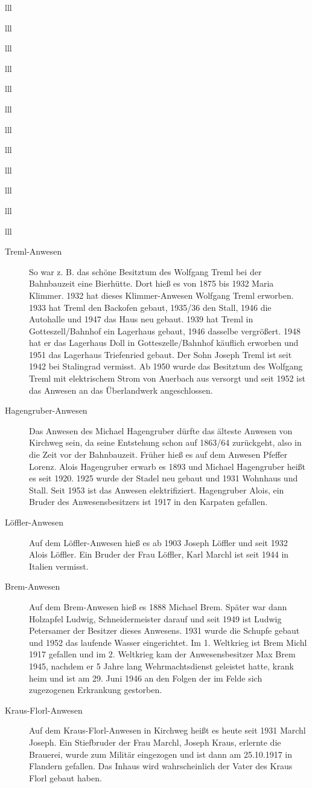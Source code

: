 \documentclass[12pt,a4pager]{book}
\begin{document}
\begin{tabuluar}{lll}
\begin{tabuluar}{lll}
\begin{tabuluar}{lll}
\begin{tabuluar}{lll}
\begin{tabuluar}{lll}
\begin{tabuluar}{lll}
\begin{tabuluar}{lll}
\begin{tabuluar}{lll}
\begin{tabuluar}{lll}
\begin{tabuluar}{lll}
\begin{tabuluar}{lll}
\begin{tabuluar}{lll}
\begin{description}
\item[Treml-Anwesen] So war z. B. das schöne Besitztum des Wolfgang Treml bei
der Bahnbauzeit eine Bierhütte. Dort hieß es von 1875 bis 1932 Maria Klimmer.
1932 hat dieses Klimmer-Anwesen Wolfgang Treml erworben. 1933 hat Treml den
Backofen gebaut, 1935/36 den Stall, 1946 die Autohalle und 1947 das Haus neu
gebaut. 1939 hat Treml in Gotteszell/Bahnhof ein Lagerhaus gebaut, 1946 dasselbe
vergrößert. 1948 hat er das Lagerhaus Doll in Gotteszelle/Bahnhof käuflich
erworben und 1951 das Lagerhaus Triefenried gebaut. Der Sohn Joseph Treml ist
seit 1942 bei Stalingrad vermisst. Ab 1950 wurde das Besitztum des Wolfgang
Treml mit elektrischem Strom von Auerbach aus versorgt und seit 1952 ist das
Anwesen an das Überlandwerk angeschlossen.

\item[Hagengruber-Anwesen] Das Anwesen des Michael Hagengruber dürfte das
älteste Anwesen von Kirchweg sein, da seine Entstehung schon auf 1863/64
zurückgeht, also in die Zeit vor der Bahnbauzeit. Früher hieß es auf dem Anwesen
Pfeffer Lorenz. Alois Hagengruber erwarb es 1893 und Michael Hagengruber heißt
es seit 1920. 1925 wurde der Stadel neu gebaut und 1931 Wohnhaus und Stall. Seit
1953 ist das Anwesen elektrifiziert. Hagengruber Alois, ein Bruder des
Anwesensbesitzers ist 1917 in den Karpaten gefallen.

\item[Löffler-Anwesen] Auf dem Löffler-Anwesen hieß es ab 1903 Joseph Löffler
und seit 1932 Alois Löffler. Ein Bruder der Frau Löffler, Karl Marchl ist seit
1944 in Italien vermisst.

\item[Brem-Anwesen] Auf dem Brem-Anwesen hieß es 1888 Michael Brem. Später war
dann Holzapfel Ludwig, Schneidermeister darauf und seit 1949 ist Ludwig
Petersamer der Besitzer dieses Anwesens. 1931 wurde die Schupfe gebaut und 1952
das laufende Wasser eingerichtet. Im 1. Weltkrieg ist Brem Michl 1917 gefallen
und im 2. Weltkrieg kam der Anwesensbesitzer Max Brem 1945, nachdem er 5 Jahre
lang Wehrmachtsdienst geleistet hatte, krank heim und ist am 29. Juni 1946 an
den Folgen der im Felde sich zugezogenen Erkrankung gestorben.

\item[Kraus-Florl-Anwesen] Auf dem Kraus-Florl-Anwesen in Kirchweg heißt es
heute seit 1931 Marchl Joseph. Ein Stiefbruder der Frau Marchl, Joseph Kraus,
erlernte die Brauerei, wurde zum Militär eingezogen und ist dann am 25.10.1917
in Flandern gefallen. Das Inhaus wird wahrscheinlich der Vater des Kraus Florl
gebaut haben.


\end{description}
\end{tabuluar}
\end{tabuluar}
\end{tabuluar}
\end{tabuluar}
\end{tabuluar}
\end{tabuluar}
\end{tabuluar}
\end{tabuluar}
\end{tabuluar}
\end{tabuluar}
\end{tabuluar}
\end{tabuluar}
\end{document}
